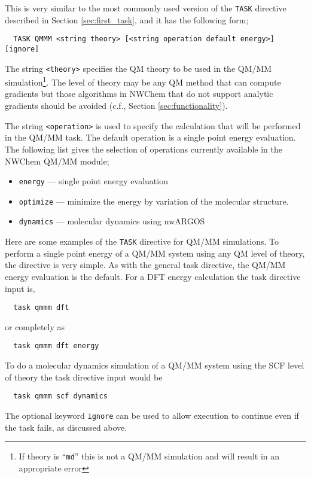 This is very similar to the most commonly used version of the
\verb+TASK+ directive described in Section \ref{sec:first_task}, and
it has the following form;

\begin{verbatim}
  TASK QMMM <string theory> [<string operation default energy>] [ignore]
\end{verbatim}

The string \verb+<theory>+ specifies the QM theory to be used in the
QM/MM simulation\footnote{If theory is ``\verb+md+'' this is not a QM/MM
  simulation and will result in an appropriate error}.  The level of
theory may be any QM method that can compute gradients but those
algorithms in NWChem that do not support analytic gradients should be
avoided (c.f., Section \ref{sec:functionality}).  

The string \verb+<operation>+ is used to specify the calculation that will
be performed in the QM/MM task.  The default operation is a single point energy
evaluation.  The following list gives the selection of operations currently
available in the NWChem QM/MM module;
\begin{itemize}
\item \verb+energy+ --- single point energy evaluation
\item \verb+optimize+ --- minimize the energy by variation of the molecular
   structure.  
\item \verb+dynamics+ --- molecular dynamics using nwARGOS
\end{itemize}

Here are some examples of the \verb+TASK+ directive for QM/MM
simulations.  To perform a single point energy of a QM/MM system using
any QM level of theory, the directive is very simple. As with the
general task directive, the QM/MM energy evaluation is the
default. For a DFT energy calculation the task directive input is,
\begin{verbatim}
  task qmmm dft
\end{verbatim}
or completely as
\begin{verbatim}
  task qmmm dft energy
\end{verbatim}

To do a molecular dynamics simulation of a QM/MM system using the SCF
level of theory the task directive input would be
\begin{verbatim}
  task qmmm scf dynamics
\end{verbatim}

The optional keyword \verb+ignore+ can be used to allow execution to
continue even if the task fails, as discussed above.


